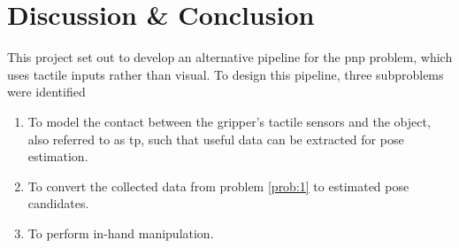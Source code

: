 \chapter{Discussion \& Conclusion}\label{ch:discussion-conlcusion}


This project set out to develop an alternative pipeline for the \gls{pnp} problem, which uses tactile inputs rather than visual. To design this pipeline, three subproblems were identified
%
\begin{enumerate}
	\item To model the contact between the gripper's tactile sensors and the object, also referred to as \gls{tp}, such that useful data can be extracted for pose estimation.
	\item To convert the collected data from problem \ref{prob:1} to estimated pose candidates.
	\item To perform in-hand manipulation.
\end{enumerate}


